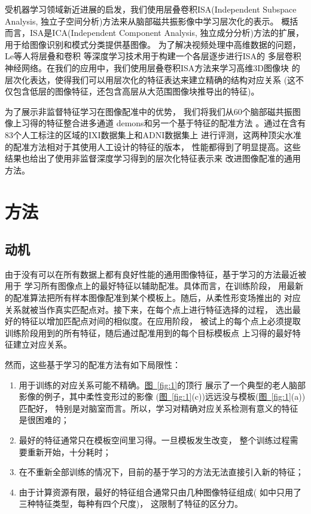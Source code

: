 \documentclass[a4paper]{article}
\numberwithin{equation}{section}
\newcommand{\figref}[1]{\hyperref[fig:#1]{\figurename~\ref*{fig:#1}}}
\renewcommand{\figurename}{图}
\begin{document}
受机器学习领域新近进展的启发，我们使用层叠卷积ISA(Independent Subspace Analysis,
独立子空间分析)方法\cite{le2011learning}来从脑部磁共振影像中学习层次化的表示。
概括而言，ISA是ICA(Independent Component Analysis, 独立成分分析)方法的扩展，
用于给图像识别和模式分类提供基图像\cite{hyvarinen2000emergence}。
为了解决视频处理中高维数据的问题，Le等人\cite{le2011learning}将层叠和卷积
\cite{lecun1995convolutional}等深度学习技术用于构建一个各层逐步进行ISA的
多层卷积神经网络。在我们的应用中，我们使用层叠卷积ISA方法来学习高维3D图像块
的层次化表达，使得我们可以用层次化的特征表达来建立精确的结构对应关系
(这不仅包含低层的图像特征，还包含高层从大范围图像块推导出的特征)。

为了展示非监督特征学习在图像配准中的优势，
我们将我们从60个脑部磁共振图像上习得的特征整合进多通道
demons\cite{peyrat2010registration}和另一个基于特征的配准方法
\cite{shen2007image}。通过在含有83个人工标注的区域的IXI数据集上和ADNI数据集上
进行评测，这两种顶尖水准的配准方法相对于其使用人工设计的特征的版本，
性能都得到了明显提高。这些结果也给出了使用非监督深度学习得到的层次化特征表示来
改进图像配准的通用方法。

\section{方法}
\subsection{动机}
由于没有可以在所有数据上都有良好性能的通用图像特征，基于学习的方法最近被用于
学习所有图像点上的最好特征以辅助配准。具体而言，在训练阶段，
用最新的配准算法把所有样本图像配准到某个模板上。随后，从柔性形变场推出的
对应关系就被当作真实匹配点对。接下来，在每个点上进行特征选择的过程，
选出最好的特征以增加匹配点对间的相似度\cite{ou2011dramms}。在应用阶段，
被试上的每个点上必须提取训练阶段用到的所有特征，随后通过配准用到的每个目标模板点
上习得的最好特征建立对应关系。

然而，这些基于学习的配准方法有如下局限性：
\begin{enumerate}
    \item 用于训练的对应关系可能不精确。\figref{1}的顶行
        展示了一个典型的老人脑部影像的例子，其中柔性变形过的影像
        (\figref{1}(c))远远没与模板(\figref{1}(a))匹配好，
        特别是对脑室而言。所以，学习对精确对应关系检测有意义的特征是很困难的；
    \item 最好的特征通常只在模板空间里习得。一旦模板发生改变，
        整个训练过程需要重新开始，十分耗时；
    \item 在不重新全部训练的情况下，目前的基于学习的方法无法直接引入新的特征；
    \item 由于计算资源有限，最好的特征组合通常只由几种图像特征组成(
        如\cite{wu2007learning}中只用了三种特征类型，每种有四个尺度)，
        这限制了特征的区分力。
\end{enumerate}
\end{document}
